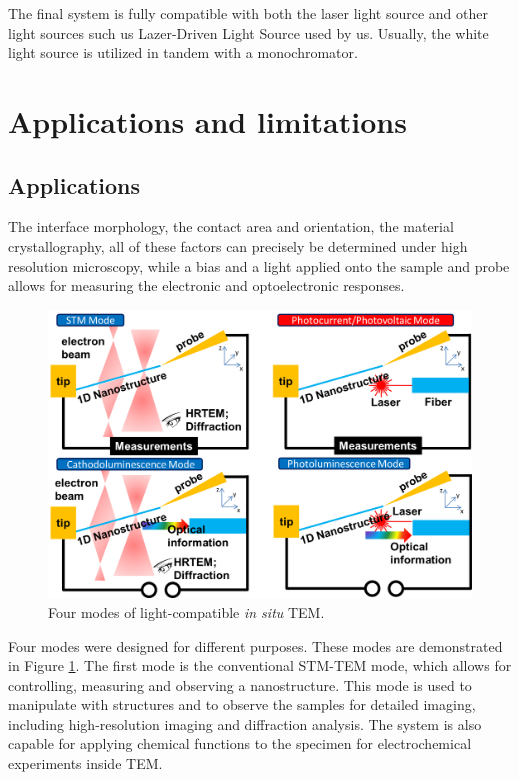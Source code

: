 The final system is fully compatible with both the laser light source and other light sources such us  Lazer-Driven Light Source used by us. Usually, the white light source is utilized in tandem with a monochromator. 

\section{Applications and limitations}
\subsection{Applications}
 The interface morphology, the contact area and orientation, the material crystallography, all of these factors can precisely be determined under high resolution microscopy, while a bias and a light applied onto the sample and probe allows for measuring the electronic and optoelectronic responses. 

\begin{figure}  
\centering
\includegraphics[width=370pt]{figures/figure2_fourmodes}
\caption[Four modes]{Four modes of light-compatible {\em in situ} TEM.
\label{fig:2_fourmodes}}
\end{figure}

Four modes were designed for different purposes. These modes are demonstrated in Figure \ref{fig:2_fourmodes}.
The first mode is the conventional STM-TEM mode, which allows for controlling, measuring and observing a nanostructure. This mode is used to manipulate with structures and to observe the samples for detailed imaging, including high-resolution imaging and diffraction analysis. 
The system is also capable for applying chemical functions to the specimen for electrochemical experiments inside TEM. 

